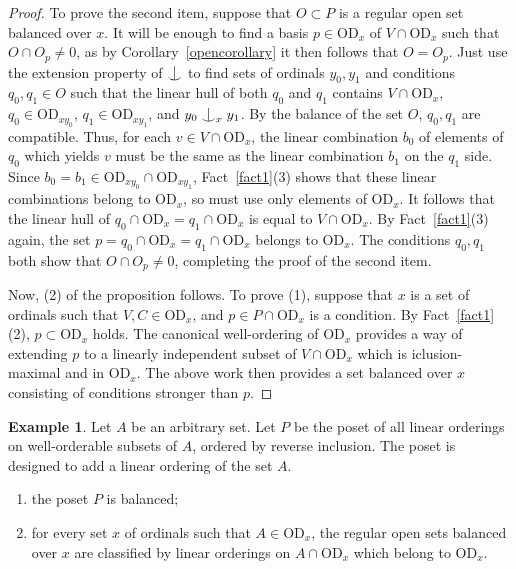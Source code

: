 \documentclass{article}
\newcommand{\vd}{\mathrm{OD}}
\newcommand{\forkindep}[1][]{%
  \mathrel{
    \mathop{
      \vcenter{
        \hbox{\oalign{\noalign{\kern-.3ex}\hfil$\vert$\hfil\cr
              \noalign{\kern-.7ex}
              $\smile$\cr\noalign{\kern-.3ex}}}
      }
    }\displaylimits_{#1}
  }
}
\theoremstyle{definition}
\newtheorem{example}[theorem]{Example}
\begin{document}
\begin{proof}
To prove the second item, suppose that $O\subset P$ is a regular open set balanced over $x$. It will be enough to find a basis $p\in\vd_x$ of $V\cap\vd_x$ such that $O\cap O_p\neq 0$, as by Corollary~\ref{opencorollary} it then follows that $O=O_p$. Just use the extension property of $\forkindep$ to find sets of ordinals $y_0, y_1$ and conditions $q_0, q_1\in O$ such that the linear hull of both $q_0$ and $q_1$ contains $V\cap\vd_x$, $q_0\in\vd_{xy_0}$, $q_1\in\vd_{xy_1}$, and $y_0\forkindep[x]y_1$. By the balance of the set $O$, $q_0, q_1$ are compatible. Thus, for each $v\in V\cap \vd_x$, the linear combination $b_0$ of elements of $q_0$ which yields $v$ must be the same as the linear combination $b_1$ on the $q_1$ side. Since $b_0=b_1\in\vd_{xy_0}\cap\vd_{xy_1}$, Fact~\ref{fact1}(3) shows that these linear combinations belong to $\vd_x$, so must use only elements of $\vd_x$. It follows that the linear hull of $q_0\cap\vd_x=q_1\cap\vd_x$ is equal to $V\cap\vd_x$. By Fact~\ref{fact1}(3) again, the set $p=q_0\cap\vd_x=q_1\cap\vd_x$ belongs to $\vd_x$. The conditions $q_0, q_1$ both show that $O\cap O_p\neq 0$, completing the proof of the second item.

Now, (2) of the proposition follows. To prove (1), suppose that $x$ is a set of ordinals such that $V, C\in\vd_x$, and $p\in P\cap\vd_x$ is a condition. By Fact~\ref{fact1}(2), $p\subset\vd_x$ holds. The canonical well-ordering of $\vd_x$ provides a way of extending $p$ to a linearly independent subset of $V\cap \vd_x$ which is iclusion-maximal and in $\vd_x$. The above work then provides a set balanced over $x$ consisting of conditions stronger than $p$.
\end{proof}

\begin{example}
\label{loexample1}
Let $A$ be an arbitrary set. Let $P$ be the poset of all linear orderings on well-orderable subsets of $A$, ordered by reverse inclusion. The poset is designed to add a linear ordering of the set $A$.

\begin{enumerate}
\item the poset $P$ is balanced;
\item for every set $x$ of ordinals such that $A\in\vd_x$, the regular open sets balanced over $x$ are classified by linear orderings on $A\cap\vd_x$ which belong to $\vd_x$.
\end{enumerate}
\end{example}
\end{document}
